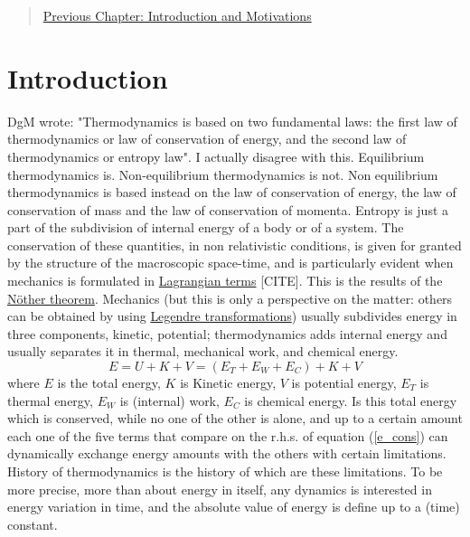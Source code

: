 \begin{quote}
\href{https://www.authorea.com/users/24891/articles/130803/_show_article}{Previous Chapter: Introduction  and Motivations}
\end{quote}

\section{Introduction}

DgM wrote: "Thermodynamics is based on two fundamental laws: the first law of thermodynamics or law of conservation of energy, and the second law of thermodynamics or entropy law".  I actually disagree with this. Equilibrium thermodynamics is. Non-equilibrium thermodynamics is not. Non equilibrium thermodynamics is based instead on the law of conservation of energy, the law of conservation of mass and the law of conservation of momenta. Entropy is just a part of the subdivision of internal energy of a body or of a system. The conservation of these quantities, in non relativistic conditions, is given for granted by the structure of the macroscopic space-time, and is particularly evident when mechanics is formulated in \href{https://en.wikipedia.org/wiki/Lagrangian_mechanics}{Lagrangian terms} [CITE]. This is the results of the \href{https://en.wikipedia.org/wiki/Noether%27s_theorem}{Nöther theorem}. 
Mechanics (but this is only a perspective on the matter: others can be obtained by using \href{https://en.wikipedia.org/wiki/Legendre_transformation}{Legendre transformations}) usually subdivides energy in three components, kinetic, potential; thermodynamics adds internal  energy and usually separates it in thermal, mechanical work, and chemical energy.
\begin{equation}
E = U  + K + V = (E_T + E_W + E_C) + K + V
\label{e_cons}
\end{equation}
where $E$ is the total energy, $K$ is Kinetic energy, $V$ is potential energy, $E_T$ is thermal energy, $E_W$ is (internal) work, $E_C$ is chemical energy. Is this total energy which is conserved, while no one of the other is alone, and up to a certain amount each one of the five terms that compare on the r.h.s. of equation (\ref{e_cons}) can dynamically exchange energy amounts with the others with certain limitations. 
History of thermodynamics is the history of which are these limitations. To be more precise, more than about energy in itself, any dynamics is interested in energy variation in time, and the absolute value of energy is define up to a (time) constant. 
